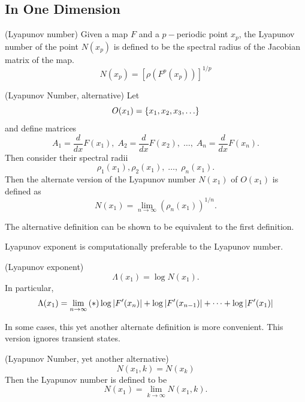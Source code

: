 \documentclass[12pt,twoside]{book}
\begin{document}
\subsection{In One Dimension}
\begin{definition}
  (Lyapunov number)
  Given a map $F$ and a $p-$periodic point $x_p$, the Lyapunov number of the point $N(x_p)$ is
  defined to be the spectral radius of the Jacobian matrix of the map.
  \begin{equation*}
    N(x_p) = \left[ \rho\left( F^p(x_p) \right) \right]^{1/p}
  \end{equation*}
  \label{def:lyapnum}
\end{definition}

\begin{definition}
  (Lyapunov Number, alternative)
  Let
  \begin{equation*}
    O(x_1) = \left \{ x_1, x_2, x_3, \ldots \right \}
  \end{equation*}
  and define matrices
  \begin{equation*}
    A_1 = \frac{d}{dx}F(x_1),\; A_2 = \frac{d}{dx}F(x_2),\; \ldots,\; A_n = \frac{d}{dx}F(x_n).
  \end{equation*}
  Then consider their spectral radii
  \begin{equation*}
    \rho_1(x_1), \rho_2(x_1),\; \ldots,\; \rho_n(x_1).
  \end{equation*}
  Then the alternate version of the Lyapunov number $N(x_1)$ of $O(x_1)$ is defined as 
  \begin{equation*}
    N(x_1) = \lim\limits_{n \to \infty} (\rho_n(x_1))^{1/n}.
  \end{equation*}
\end{definition}
The alternative definition can be shown to be equivalent to the first definition.

Lyapunov exponent is computationally preferable to the Lyapunov number.
\begin{definition}
  (Lyapunov exponent)
  \begin{equation*}
    \Lambda(x_1) = \log N(x_1).
  \end{equation*}
  In particular,
  \begin{equation*}
    \Lambda(x_1) = \lim\limits_{n \to \infty} \left ( * \right ){\log\left | F'(x_n) \right | + \log\left | F'(x_{n-1}) \right | + \cdots + \log\left | F'(x_1) \right |}
  \end{equation*}
\end{definition}

In some cases, this yet another alternate definition is more convenient.
This version ignores transient states.
\begin{definition}
  (Lyapunov Number, yet another alternative)
  \begin{equation*}
    N(x_1, k) = N(x_k)
  \end{equation*}
  Then the Lyapunov number is defined to be
  \begin{equation*}
    N(x_1) = \lim\limits_{k \to \infty} N(x_1,k).
  \end{equation*}
\end{definition}
\end{document}
